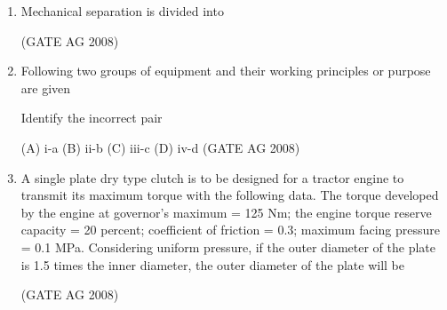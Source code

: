 \documentclass[journal,12pt,onecolumn]{IEEEtran}
\begin{document}
\begin{enumerate}
\medskip

\item 
 Mechanical separation is divided into
\begin{enumerate}
\end{enumerate}
\hfill(GATE AG 2008)\\

\medskip

\item 
 Following two groups of equipment and their working principles or purpose are given
 


\medskip

Identify the incorrect pair

(A) i-a \quad (B) ii-b \quad (C) iii-c \quad (D) iv-d
\hfill(GATE AG 2008)\\

\item 
 A single plate dry type clutch is to be designed for a tractor engine to transmit its maximum torque with the following data. The torque developed by the engine at governor's maximum = 125 Nm; the engine torque reserve capacity = 20 percent; coefficient of friction = 0.3; maximum facing pressure = 0.1 MPa. Considering uniform pressure, if the outer diameter of the plate is 1.5 times the inner diameter, the outer diameter of the plate will be
\begin{enumerate}
\end{enumerate}
\hfill(GATE AG 2008)\\

\medskip


\end{enumerate}
\end{document}
